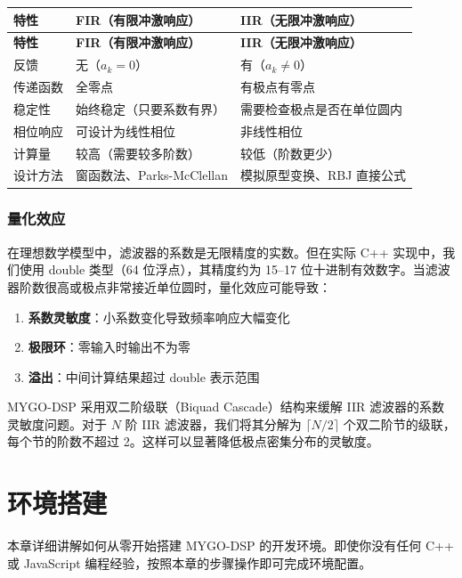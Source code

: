 ﻿\documentclass[12pt,a4paper,oneside]{ctexbook}
\begin{document}
\begin{longtable}{p{3cm}p{5cm}p{5cm}}
    \toprule
    \textbf{特性} & \textbf{FIR（有限冲激响应）} & \textbf{IIR（无限冲激响应）} \\
    \midrule
    \endfirsthead
    \toprule
    \textbf{特性} & \textbf{FIR（有限冲激响应）} & \textbf{IIR（无限冲激响应）} \\
    \midrule
    \endhead
    \bottomrule
    \endfoot
    反馈 & 无（\(a_k = 0\)） & 有（\(a_k \neq 0\)） \\
    传递函数 & 全零点 & 有极点有零点 \\
    稳定性 & 始终稳定（只要系数有界） & 需要检查极点是否在单位圆内 \\
    相位响应 & 可设计为线性相位 & 非线性相位 \\
    计算量 & 较高（需要较多阶数） & 较低（阶数更少） \\
    设计方法 & 窗函数法、Parks-McClellan & 模拟原型变换、RBJ 直接公式 \\
    \bottomrule
\end{longtable}

\subsection{量化效应}

在理想数学模型中，滤波器的系数是无限精度的实数。但在实际 C++ 实现中，我们使用 double 类型（64 位浮点），其精度约为 15--17 位十进制有效数字。当滤波器阶数很高或极点非常接近单位圆时，量化效应可能导致：

\begin{enumerate}
    \item \textbf{系数灵敏度}：小系数变化导致频率响应大幅变化
    \item \textbf{极限环}：零输入时输出不为零
    \item \textbf{溢出}：中间计算结果超过 double 表示范围
\end{enumerate}

MYGO-DSP 采用双二阶级联（Biquad Cascade）结构来缓解 IIR 滤波器的系数灵敏度问题。对于 \(N\) 阶 IIR 滤波器，我们将其分解为 \(\lceil N/2 \rceil\) 个双二阶节的级联，每个节的阶数不超过 2。这样可以显著降低极点密集分布的灵敏度。

\clearpage

\chapter{环境搭建}

本章详细讲解如何从零开始搭建 MYGO-DSP 的开发环境。即使你没有任何 C++ 或 JavaScript 编程经验，按照本章的步骤操作即可完成环境配置。
\end{document}
